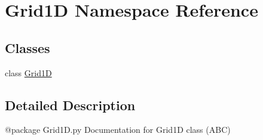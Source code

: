 \hypertarget{namespaceGrid1D}{\section{Grid1\-D Namespace Reference}
\label{namespaceGrid1D}
}
\subsection*{Classes}
\begin{DoxyCompactItemize}
\item 
class \hyperlink{classGrid1D_1_1Grid1D}{Grid1\-D}
\end{DoxyCompactItemize}


\subsection{Detailed Description}
\begin{DoxyVerb}@package Grid1D.py
Documentation for Grid1D class (ABC)
\end{DoxyVerb}
 
